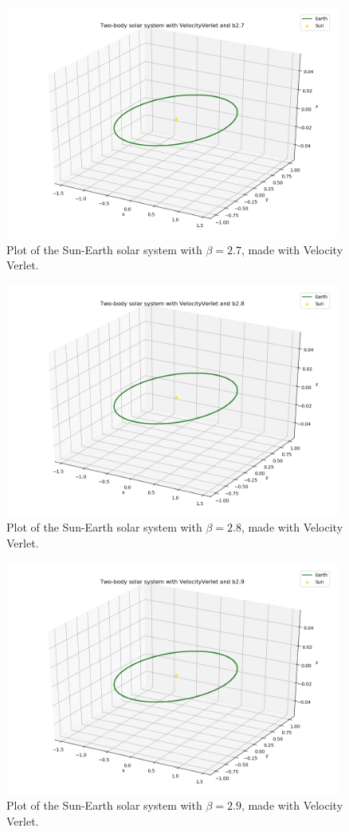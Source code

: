 \documentclass{article}
\begin{document}
    \begin{figure}[H]
        \centering
        \includegraphics[width = 11cm]{img/plot3D_S_E_V_b27.png}
        \caption{Plot of the Sun-Earth solar system with $\beta = 2.7$, made with Velocity Verlet.}
        \label{fig:plot3D_S_E_V_b27}
    \end{figure}

    \begin{figure}[H]
        \centering
        \includegraphics[width = 11cm]{img/plot3D_S_E_V_b28.png}
        \caption{Plot of the Sun-Earth solar system with $\beta = 2.8$, made with Velocity Verlet.}
        \label{fig:plot3D_S_E_V_b28}
    \end{figure}

    \begin{figure}[H]
        \centering
        \includegraphics[width = 11cm]{img/plot3D_S_E_V_b29.png}
        \caption{Plot of the Sun-Earth solar system with $\beta = 2.9$, made with Velocity Verlet.}
        \label{fig:plot3D_S_E_V_b29}
    \end{figure}
\end{document}
